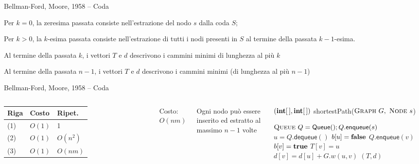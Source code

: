 \begin{frame}{Bellman-Ford, Moore, 1958 -- Coda}

\vspace{-9pt}
\begin{myboxtitle}
\BIL
\item Per $k=0$, la zeresima passata consiste nell'estrazione del nodo $s$ dalla coda $S$;
\item Per $k>0$, la $k$-esima passata consiste nell'estrazione di tutti i nodi 
presenti in $S$ al termine della passata $k-1$-esima.
\EIL
\end{myboxtitle}

\begin{myboxtitle}
\BIL
\item Al termine della passata $k$, i vettori $T$ e $d$ descrivono i cammini minimi di
lunghezza al più $k$ 
\item Al termine della passata $n-1$, i vettori $T$ e $d$ descrivono i cammini minimi
(di lunghezza al più $n-1$)
\EIL
\end{myboxtitle}

\end{frame}

\begin{frame}{Bellman-Ford, Moore, 1958 -- Coda}


\vspace{-9pt}

\begin{columns}

\begingroup
\renewcommand*{\arraystretch}{1.2}
\begin{tabular}{|l|l|l|}
\hline
Riga & Costo & Ripet. \\\hline
(1) & $O(1)$ & 1 \\\hline
(2) & $O(1)$ & $O(n^2)$ \\\hline
(3) & $O(1)$ & $O(nm)$ \\\hline
\end{tabular}
\endgroup

\medskip
Costo: \alert{$O(nm)$}

\medskip
Ogni nodo può essere inserito ed estratto al massimo $n-1$ volte

\vspace{-12pt}
\footnotesize
\begin{Procedure}
\caption[A]{\footnotesize $(\INTARRAY, \INTARRAY)$ \textsf{shortestPath}($\textsc{Graph}\ G,\ \textsc{Node}\ s$)}
\alert{$\textsc{Queue}\ Q = \textsf{Queue}(); Q.\textsf{enqueue}(s)$}\;
{
  \alert{$u = Q.\textsf{dequeue}()$}\;
  $b[u] = \FALSE$\;
  {
    {
      {
        \alert{$Q.\textsf{enqueue}(v)$}\;
        $b[v] = \TRUE$\;
      }
      $T[v] = u$\;
      $d[v] = d[u] + G.w(u,v)$\;
    }
  }
}
\Return $(T,d)$
\end{Procedure}
\end{columns}

\end{frame}

